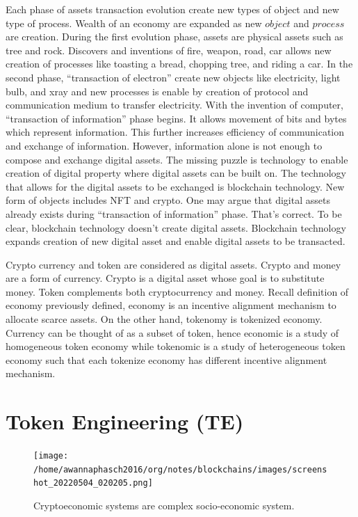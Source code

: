 \documentclass{IEEEtran}
\begin{document}
Each phase of assets transaction evolution create new types of object and new type of process. Wealth of an economy are expanded as new \(object\) and \(process\) are creation. During the first evolution phase, assets are physical assets such as tree and rock. Discovers and inventions of fire, weapon, road, car allows new creation of processes like toasting a bread, chopping tree, and riding a car. In the second phase, ``transaction of electron'' create new objects like electricity, light bulb, and xray and new processes is enable by creation of protocol and communication medium to transfer electricity. With the invention of computer, ``transaction of information'' phase begins. It allows movement of bits and bytes which represent information. This further increases efficiency of communication and exchange of information. However, information alone is not enough to compose and exchange digital assets. The missing puzzle is technology to enable creation of digital property where digital assets can be built on. The technology that allows for the digital assets to be exchanged is blockchain technology. New form of objects includes NFT and crypto. One may argue that digital assets already exists during ``transaction of information'' phase. That's correct. To be clear, blockchain technology doesn't create digital assets. Blockchain technology expands creation of new digital asset and enable digital assets to be transacted.

Crypto currency and token are considered as digital assets. Crypto and money are a form of currency. Crypto is a digital asset whose goal is to substitute money. Token complements both cryptocurrency and money. Recall definition of economy previously defined, economy is an incentive alignment mechanism to allocate scarce assets. On the other hand, tokenomy is tokenized economy. Currency can be thought of as a subset of token, hence economic is a study of homogeneous token economy while tokenomic is a study of heterogeneous token economy such that each tokenize economy has different incentive alignment mechanism.

\section{Token Engineering (TE)}
\label{sec:org77c274b}
\begin{figure}[htbp]
\centering
\texttt{[image: /home/awannaphasch2016/org/notes/blockchains/images/screenshot\_20220504\_020205.png]}
\caption{\label{tokenomics_sytem}Cryptoeconomic systems are complex socio-economic system.}
\end{figure}
\end{document}
